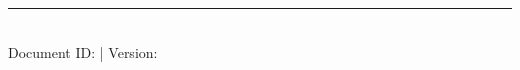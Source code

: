 
\begin{titlepage}
    \begin{center}
        \vspace*{1.5cm}
        
        
        {\Huge \bfseries \textcolor{primarycolor}{\@title} \par}
        \vspace{0.5cm}
        
        {\Large \itshape \@subtitle \par}
        \vspace{2cm}
        
        {\Large \bfseries \@author \par}
        \vspace{0.5cm}
        
        {\large \@institution \par}
        \vspace{1cm}
        
        {\large \@date \par}
        
        \vfill
        
        \rule{0.8\textwidth}{0.4pt} \\
        \vspace{0.2cm}
        \small{Document ID: \@docid \quad | \quad Version: \@version}
        
    \end{center}
\end{titlepage}
